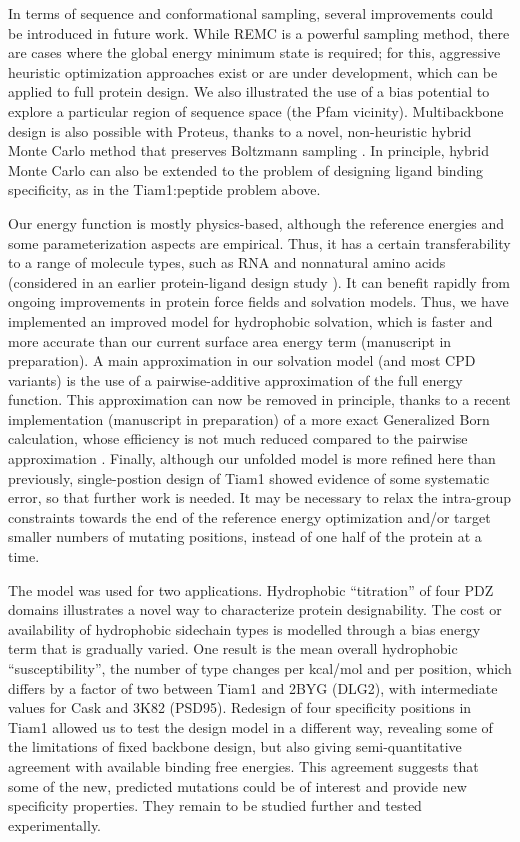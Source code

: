 \documentclass[12pt]{article}
\begin{document}
In terms of sequence and conformational sampling, several improvements could be introduced in future work. While REMC is a
powerful sampling method, there are cases where the global energy minimum state is required; for this, aggressive heuristic
optimization approaches exist or are under development, which can be applied to full protein design. We also illustrated the
use of a bias potential to explore a particular region of sequence space (the Pfam vicinity). Multibackbone design is also
possible with Proteus, thanks to a novel, non-heuristic hybrid Monte Carlo method that preserves Boltzmann sampling
\cite{Druart17}. In principle, hybrid Monte Carlo can also be extended to the problem of designing ligand binding specificity,
as in the Tiam1:peptide problem above.

Our energy function is mostly physics-based, although the reference energies and some parameterization aspects are empirical.
Thus, it has a certain transferability to a range of molecule types, such as RNA and nonnatural amino acids (considered in an
earlier protein-ligand design study \cite{Druart16}). It can benefit rapidly from ongoing improvements in protein force fields
and solvation models. Thus, we have implemented an improved model for hydrophobic solvation, which is faster and more accurate
than our current surface area energy term (manuscript in preparation). A main approximation in our solvation model (and most CPD
variants) is the use of a pairwise-additive approximation of the full energy function. This approximation can now be removed
in principle, thanks to a recent implementation (manuscript in preparation) of a more exact Generalized Born calculation, whose
efficiency is not much reduced compared to the pairwise approximation \cite{Archontis05b}. Finally, although our unfolded model
is more refined here than previously, single-postion design of Tiam1 showed evidence of some systematic error, so that further
work is needed. It may be necessary to relax the intra-group constraints towards the end of the reference energy optimization
and/or target smaller numbers of mutating positions, instead of one half of the protein at a time.

The model was used for two applications. Hydrophobic ``titration'' of four PDZ domains illustrates a novel way to characterize 
protein designability. The cost or availability of hydrophobic sidechain types is modelled through a bias energy term that is
gradually varied. One result is the mean overall hydrophobic ``susceptibility'', the number of type changes per kcal/mol and
per position, which differs by a factor of two between Tiam1 and 2BYG (DLG2), with intermediate values for Cask and 3K82 (PSD95).
Redesign of four specificity positions in Tiam1 allowed us to test the design model in a different way, revealing some of the
limitations of fixed backbone design, but also giving semi-quantitative agreement with available binding free energies. This
agreement suggests that some of the new, predicted mutations could be of interest and provide new specificity properties. They
remain to be studied further and tested experimentally.
\end{document}
